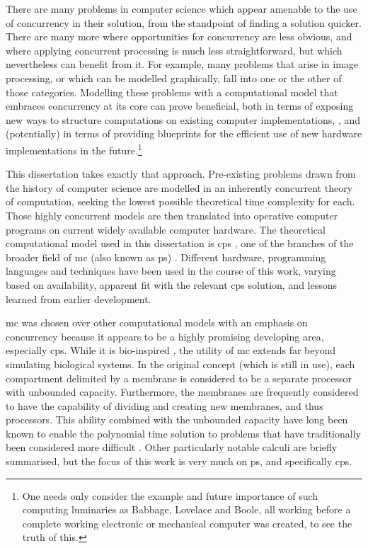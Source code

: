 There are many problems in computer science which appear amenable to the use of concurrency in their solution, from the standpoint of finding a solution quicker.  There are many more where opportunities for concurrency are less obvious, and where applying concurrent processing is much less straightforward, but which nevertheless can benefit from it.  For example, many problems that arise in image processing, or which can be modelled graphically, fall into one or the other of those categories.  Modelling these problems with a computational model that embraces concurrency at its core can prove beneficial, both in terms of exposing new ways to structure computations on existing computer implementations, \eg{} \cite{GimelFarb2013a,Nicolescu2014b}, and (potentially) in terms of providing blueprints for the efficient use of new hardware implementations in the future.\footnote{One needs only consider the example and future importance of such computing luminaries as Babbage, Lovelace and Boole, all working before a complete working electronic or mechanical computer was created, to see the truth of this.}

This dissertation takes exactly that approach.  Pre-existing problems drawn from the history of computer science are modelled in an inherently concurrent theory of computation, seeking the lowest possible theoretical time complexity for each.  Those highly concurrent models are then translated into operative computer programs on current widely available computer hardware.  The theoretical computational model used in this dissertation is \gls{cps} \cite{Nicolescu2018}, one of the branches of the broader field of \gls{mc} (also known as \gls{ps}) \cite{Paun2010b,Paun2002}.  Different hardware, programming languages and techniques have been used in the course of this work, varying based on availability, apparent fit with the relevant \gls{cps} solution, and lessons learned from earlier development.

\Gls{mc} was chosen over other computational models with an emphasis on concurrency because it appears to be a highly promising developing area, especially \gls{cps}.  While it is bio-inspired \cite{Paun2000}, the utility of \gls{mc} extends far beyond simulating biological systems.  In the original concept (which is still in use), each compartment delimited by a membrane is considered to be a separate processor with unbounded capacity.  Furthermore, the membranes are frequently considered to have the capability of dividing and creating new membranes, and thus processors.  This ability combined with the unbounded capacity have long been known to enable the polynomial time solution to problems that have traditionally been considered more difficult \cite{Paun1999a,Sosik2003}.
Other particularly notable calculi are briefly summarised, but the focus of this work is very much on \gls{ps}, and specifically \gls{cps}.%

